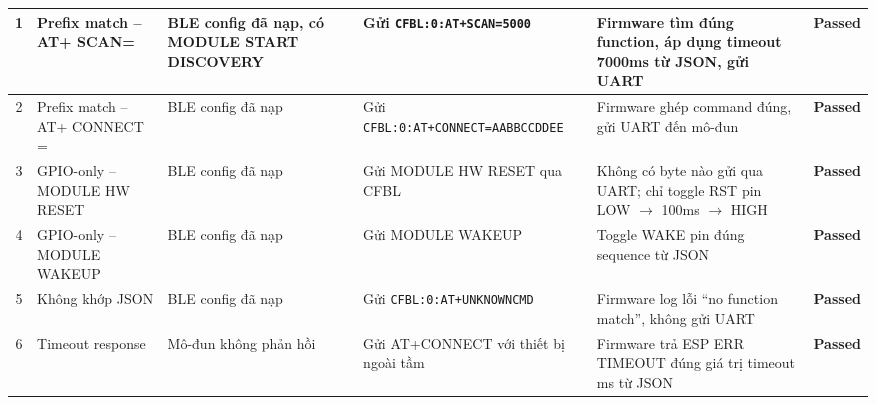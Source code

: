 \begin{longtable}{|c|p{}|p{}|p{}|p{}|c|}
            1 & Prefix match -- AT+ \newline SCAN= & BLE config đã nạp, có MODULE START DISCOVERY & Gửi \texttt{CFBL:0:}\newline\texttt{AT+SCAN=5000} & Firmware tìm đúng function, áp dụng timeout 7000ms từ JSON, gửi UART & \textcolor{modern_blue}{\textbf{Passed}} \\ \hline
            2 & Prefix match -- AT+ \newline CONNECT \newline = & BLE config đã nạp & Gửi \texttt{CFBL:0:}\newline\texttt{AT+CONNECT=}\newline\texttt{AABBCCDDEE} & Firmware ghép command đúng, gửi UART đến mô-đun & \textcolor{modern_blue}{\textbf{Passed}} \\ \hline
            3 & GPIO-only -- MODULE HW RESET & BLE config đã nạp & Gửi MODULE HW RESET qua CFBL & Không có byte nào gửi qua UART; chỉ toggle RST pin LOW $\rightarrow$ 100ms $\rightarrow$ HIGH & \textcolor{modern_blue}{\textbf{Passed}} \\ \hline
            4 & GPIO-only -- MODULE WAKEUP & BLE config đã nạp & Gửi MODULE WAKEUP & Toggle WAKE pin đúng sequence từ JSON & \textcolor{modern_blue}{\textbf{Passed}} \\ \hline
            5 & Không khớp JSON & BLE config đã nạp & Gửi \texttt{CFBL:0:}\newline\texttt{AT+UNKNOWNCMD} & Firmware log lỗi ``no function match'', không gửi UART & \textcolor{modern_blue}{\textbf{Passed}} \\ \hline
            6 & Timeout response & Mô-đun không phản hồi & Gửi AT+CONNECT với thiết bị ngoài tầm & Firmware trả ESP ERR TIMEOUT đúng giá trị timeout ms từ JSON & \textcolor{modern_blue}{\textbf{Passed}} \\ \hline
        \end{longtable}
        
